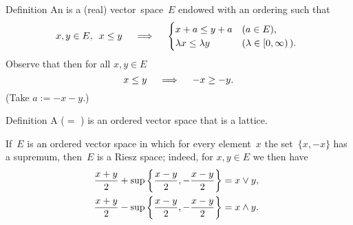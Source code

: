 \documentclass[main.tex]{subfiles}
\begin{document}
%
%
\begin{psec}{Definition}
\label{1.2}
An  
is a (real) vector~space~$E$
endowed with an ordering such that
\begin{equation*}
x,y\in E\textnormal{, }\ x\leq y
 \quad \implies \quad
\begin{cases}
x+a \leq y+a  
  & (a\in E)\textnormal{, } \\
\lambda x \leq \lambda y 
  & (\lambda \in [0,\infty)\,)\textnormal{. }
\end{cases}
\end{equation*}
Observe that then for all $x,y\in E$
\begin{equation*}
x\leq y \quad \implies \quad -x \geq -y\textnormal{.}
\end{equation*}
(Take $a:=-x-y$.)
\end{psec}
%
%
\begin{psec}{Definition}
\label{1.3}
A  ($=$ )
is an ordered vector space that is a lattice.

If~$E$ is an ordered vector space 
in which for every element~$x$
the set~$\{x,-x\}$ has a supremum,
then~$E$ is a Riesz space;
indeed,
for $x,y\in E$
we then have
\begin{align*}
\frac{x+y}{2} + \sup\left\{ \frac{x-y}{2}, -\frac{x-y}{2} \right\} 
  & = x\vee y\textnormal{,} \\ 
\frac{x+y}{2} - \sup\left\{ \frac{x-y}{2}, -\frac{x-y}{2} \right\}
  & = x\wedge y\textnormal{. }
\end{align*}
\end{psec}
%
%
\end{document}
